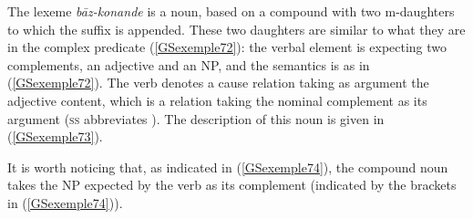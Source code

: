\ea
\label{GSexemple72}
\z
%
The lexeme \emph{b\=az-konande} is a noun, based on a compound with two m-daughters to which the suffix  is appended.
These two daughters are similar to what they are in the complex predicate (\ref{GSexemple72}): the verbal element is expecting two complements, an adjective and an NP, and the semantics is as in (\ref{GSexemple72}). The verb denotes a cause relation taking as argument the adjective content, which is a relation taking the nominal complement as its argument (\textsc{ss} abbreviates \synsem). The description of this noun is given in (\ref{GSexemple73}).

\ea
{}
\label{GSexemple73}
\z

\largerpage[2]
\noindent
It is worth noticing that, as indicated in (\ref{GSexemple74}), the compound noun takes the NP
expected by the verb as its complement (indicated by the brackets in (\ref{GSexemple74})).

